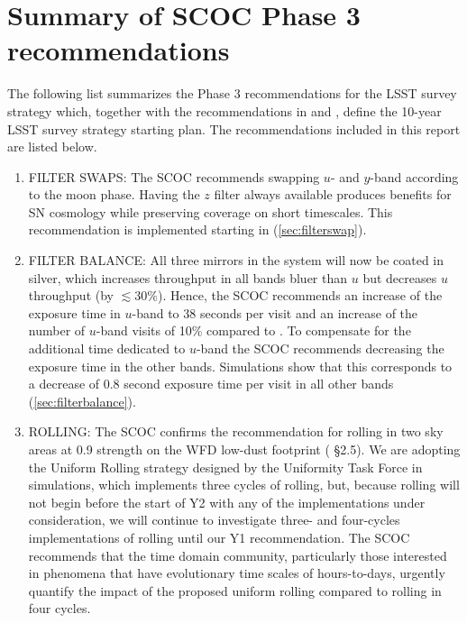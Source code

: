 \section{Summary of SCOC Phase 3 recommendations}\label{sec:summary}

The following list summarizes the Phase 3 recommendations for the LSST survey strategy which, together with the recommendations in  and , define the 10-year LSST survey strategy starting plan.   The recommendations included in this report are listed below.

\begin{enumerate}
\renewcommand{\labelenumi}{\roman{enumi}.} 

\item FILTER SWAPS: The SCOC recommends swapping $u$- and $y$-band according to the moon phase. Having the $z$ filter always available produces benefits for SN cosmology while preserving coverage on short timescales. This recommendation is implemented starting in  (\autoref{sec:filterswap}).

\item FILTER BALANCE: All three mirrors in the system will now be coated in silver, which increases throughput in all bands bluer than $u$ but decreases $u$ throughput (by $\lesssim30\%$). Hence, the SCOC recommends an increase of the exposure time in $u$-band to 38 seconds per visit and an increase of the number of $u$-band visits of 10\% compared to . To compensate for the additional time dedicated to $u$-band the SCOC recommends decreasing the exposure time in the other bands. Simulations show that this corresponds to a decrease of 0.8 second exposure time per visit in all other bands (\autoref{sec:filterbalance}).

\item  ROLLING: The SCOC confirms the recommendation for rolling in two sky areas at 0.9 strength on the WFD low-dust footprint ( \S2.5). We are adopting the  Uniform Rolling strategy designed by the Uniformity Task Force in  simulations, which implements three cycles of rolling, but, because rolling will not begin before the start of Y2 with any of the implementations under consideration, we will continue to investigate three- and four-cycles implementations of rolling until our Y1 recommendation.  
The SCOC recommends that the time domain community, particularly those interested in phenomena that have evolutionary time scales of hours-to-days, urgently quantify the impact of the proposed uniform rolling compared to rolling in four cycles. 


\end{enumerate}
